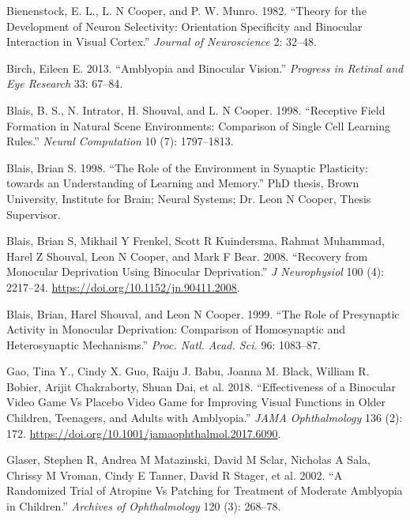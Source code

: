 \documentclass[
  letterpaper,
]{book}
\newlength{\cslhangindent}
\newlength{\cslentryspacingunit} %
\newenvironment{CSLReferences}[2] %
 {%
  \setlength{\parindent}{0pt}
  \ifodd #1
  \let\oldpar\par
  \def\par{\hangindent=\cslhangindent\oldpar}
  \fi
  \setlength{\parskip}{#2\cslentryspacingunit}
 }%
 {}
\begin{document}
\hypertarget{refs}{}
\begin{CSLReferences}{1}{0}
\leavevmode{}%
Bienenstock, E. L., L. N Cooper, and P. W. Munro. 1982. {``Theory for
the Development of Neuron Selectivity: Orientation Specificity and
Binocular Interaction in Visual Cortex.''} \emph{Journal of
Neuroscience} 2: 32--48.

\leavevmode{}%
Birch, Eileen E. 2013. {``Amblyopia and Binocular Vision.''}
\emph{Progress in Retinal and Eye Research} 33: 67--84.

\leavevmode{}%
Blais, B. S., N. Intrator, H. Shouval, and L. N Cooper. 1998.
{``Receptive Field Formation in Natural Scene Environments: Comparison
of Single Cell Learning Rules.''} \emph{Neural Computation} 10 (7):
1797--1813.

\leavevmode{}%
Blais, Brian S. 1998. {``The Role of the Environment in Synaptic
Plasticity:\\
towards an Understanding of Learning and Memory.''} PhD thesis, Brown
University, Institute for Brain; Neural Systems; Dr. Leon N Cooper,
Thesis Supervisor.

\leavevmode{}%
Blais, Brian S, Mikhail Y Frenkel, Scott R Kuindersma, Rahmat Muhammad,
Harel Z Shouval, Leon N Cooper, and Mark F Bear. 2008. {``Recovery from
Monocular Deprivation Using Binocular Deprivation.''} \emph{J
Neurophysiol} 100 (4): 2217--24.
\url{https://doi.org/10.1152/jn.90411.2008}.

\leavevmode{}%
Blais, Brian, Harel Shouval, and Leon N Cooper. 1999. {``The Role of
Presynaptic Activity in Monocular Deprivation: Comparison of
Homosynaptic and Heterosynaptic Mechanisms.''} \emph{Proc. Natl. Acad.
Sci.} 96: 1083--87.

\leavevmode{}%
Gao, Tina Y., Cindy X. Guo, Raiju J. Babu, Joanna M. Black, William R.
Bobier, Arijit Chakraborty, Shuan Dai, et al. 2018. {``Effectiveness of
a Binocular Video Game Vs Placebo Video Game for Improving Visual
Functions in Older Children, Teenagers, and Adults with Amblyopia.''}
\emph{JAMA Ophthalmology} 136 (2): 172.
\url{https://doi.org/10.1001/jamaophthalmol.2017.6090}.

\leavevmode{}%
Glaser, Stephen R, Andrea M Matazinski, David M Sclar, Nicholas A Sala,
Chrissy M Vroman, Cindy E Tanner, David R Stager, et al. 2002. {``A
Randomized Trial of Atropine Vs Patching for Treatment of Moderate
Amblyopia in Children.''} \emph{Archives of Ophthalmology} 120 (3):
268--78.


\end{CSLReferences}
\end{document}
